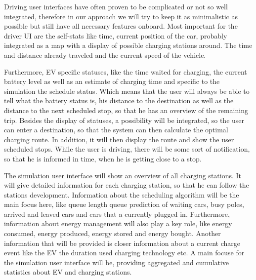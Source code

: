 \documentclass[hidelinks]{sig-alternate}
\begin{document}
Driving user interfaces have often proven to be complicated or not so well integrated, therefore in our approach we
will try to keep it as minimalistic as possible but still have all necessary features onboard. Most important for the
driver UI are the self-stats like time, current position of the car, probably integrated as a map with a display of
possible charging stations around. The time and distance already traveled and the current speed of the vehicle.

Furthermore, EV specific statuses, like the time waited for charging, the current battery level as well as an
estimate of charging time and specific to the simulation the schedule status. Which means that the user will always
be able to tell what the battery status is, his distance to the destination as well as the distance to the next
scheduled stop, so that he has an overview of the remaining trip. Besides the display of statuses, a possibility
will be integrated, so the user can enter a destination, so that the system can then calculate the optimal charging
route. In addition, it will then display the route and show the user scheduled stops. While the user is driving,
there will be some sort of notification, so that he is informed in time, when he is getting close to a stop.

The simulation user interface will show an overview of all charging stations. It will give detailed information for
each charging station, so that he can follow the stations development. Information about the scheduling algorithm
will be the main focus here, like queue length queue prediction of waiting cars, busy poles, arrived and leaved cars
and cars that a currently plugged in. Furthermore, information about energy management will also play a key role,
like energy consumed, energy produced, energy stored and energy bought. Another information that will be provided is
closer information about a current charge event like the EV the duration used charging technology etc. A main focuse
for the simulation user interface will be, providing aggregated and cumulative statistics about EV and charging
stations.
\end{document}
